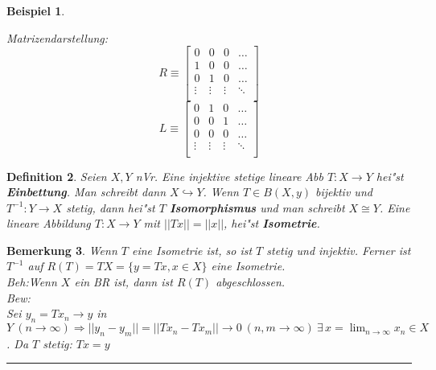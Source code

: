 \documentclass[a4paper,11pt]{book}
\newcommand{\begriff}[1]{\textbf{#1}} %
\newcommand{\eb}{\begin{flushright} \rule{1ex}{1ex} \end{flushright}}
\newtheorem{Def}{Definition}[chapter]
\newtheorem{Bsp}[Def]{Beispiel}
\newtheorem{Bem}[Def]{Bemerkung}
\theoremstyle{nonumberplain}
\begin{document}
\begin{Bsp}
\begin{enumerate}
Matrizendarstellung:
\[
R \equiv \left[ \begin{array}{cccc}
0 & 0 & 0 & \ldots \\
1 & 0 & 0 & \ldots \\
0 & 1 & 0 & \ldots \\
\vdots & \vdots & \vdots & \ddots \\
\end{array} \right]
\]
\[
L \equiv \left[ \begin{array}{cccc}
0 & 1 & 0 & \ldots \\
0 & 0 & 1 & \ldots \\
0 & 0 & 0 & \ldots \\
\vdots & \vdots & \vdots & \ddots \\
\end{array} \right]
\]
\end{enumerate}
\end{Bsp}

\begin{Def}
Seien $X,Y$ nVr. Eine injektive stetige lineare Abb $T: X \rightarrow Y$ hei"st \begriff{Einbettung}. Man schreibt dann $X \hookrightarrow Y$. Wenn $T \in B(X,y)$ bijektiv und $T^{-1}: Y \rightarrow X$ stetig, dann hei"st $T$ \begriff{Isomorphismus} und man schreibt $X \cong Y$. Eine lineare Abbildung $T: X \rightarrow Y$ mit $||Tx|| = ||x||$, hei"st \begriff{Isometrie}.
\end{Def}

\begin{Bem}
Wenn $T$ eine Isometrie ist, so ist $T$ stetig und injektiv. Ferner ist $T^{-1}$ auf $R(T) = TX = \{ y = Tx, x \in X \}$ eine Isometrie.\\
\emph{Beh:}Wenn $X$ ein BR ist, dann ist $R(T)$ abgeschlossen.\\
\emph{Bew:}\\
Sei $y_n = Tx_n \rightarrow y$ in $Y \ (n \rightarrow \infty) \Rightarrow ||y_n - y_m|| = ||Tx_n - Tx_m|| \rightarrow 0 \ (n,m \rightarrow \infty) \ \exists\, x = \lim_{n \rightarrow \infty} x_n \in X$. Da $T$ stetig: $Tx = y$ \eb
\end{Bem}
\end{document}
